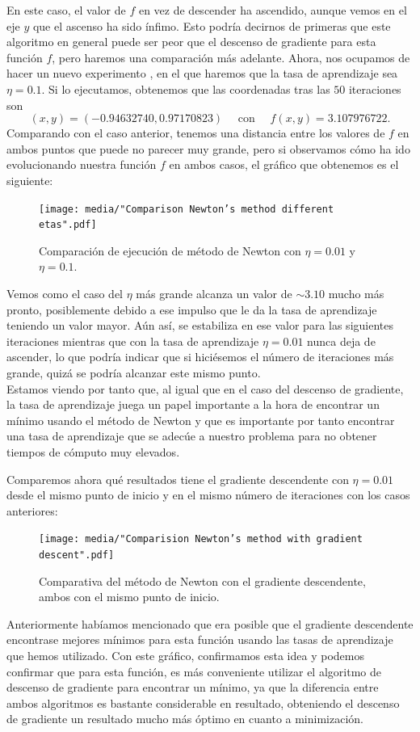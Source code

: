 \documentclass[12pt]{scrartcl}
\begin{document}
{En este caso, el valor de $f$ en vez de descender ha ascendido, aunque vemos en el eje $y$ que el ascenso ha sido ínfimo. Esto podría decirnos de primeras que este algoritmo en general puede ser peor que el descenso de gradiente para esta función $f$, pero haremos una comparación más adelante. 
Ahora, nos ocupamos de hacer un nuevo experimento , en el que haremos que la tasa de aprendizaje sea $\eta = 0.1$. Si lo ejecutamos, obtenemos que las coordenadas tras las $50$ iteraciones son 
$$
(x,y) = ( -0.94632740 ,  0.97170823 ) \quad \text{ con } \quad f(x,y) =3.107976722. 
$$
Comparando con el caso anterior, tenemos una distancia entre los valores de $f$ en ambos puntos que puede no parecer muy grande, pero si observamos cómo ha ido evolucionando nuestra función $f$ en ambos casos, el gráfico que obtenemos es el siguiente:
\begin{figure}[H]
  \centering
  \texttt{[image: media/"Comparison Newton's method different etas".pdf]}
  \caption{Comparación de ejecución de método de Newton con $\eta =0.01$ y $\eta = 0.1$.}
\end{figure}
Vemos como el caso del $\eta$ más grande alcanza un valor de $\sim 3.10$ mucho más pronto, posiblemente debido a ese impulso que le da la tasa de aprendizaje teniendo un valor mayor. Aún así, se estabiliza en ese valor para las siguientes iteraciones mientras que con la tasa de aprendizaje $\eta = 0.01$ nunca deja de ascender, lo que podría indicar que si hiciésemos
el número de iteraciones más grande, quizá se podría alcanzar este mismo punto.\\

Estamos viendo por tanto que, al igual que en el caso del descenso de gradiente, la tasa de aprendizaje juega un papel importante a la hora de encontrar un mínimo usando el método de Newton y que es importante por tanto encontrar una tasa de aprendizaje que se adecúe a nuestro problema para no obtener tiempos de cómputo muy elevados.

Comparemos ahora qué resultados tiene el gradiente descendente con $\eta =0.01$ desde el mismo punto de inicio y en el mismo número de iteraciones con los casos anteriores:
\begin{figure}[H]
  \centering
  \texttt{[image: media/"Comparision Newton's method with gradient descent".pdf]}
  \caption{Comparativa del método de Newton con el gradiente descendente, ambos con el mismo punto de inicio.}
\end{figure}

Anteriormente habíamos mencionado que era posible que el gradiente descendente encontrase mejores mínimos para esta función usando las tasas de aprendizaje que hemos utilizado. Con este gráfico, confirmamos esta idea y podemos confirmar que para 
esta función, es más conveniente utilizar el algoritmo de descenso de gradiente para encontrar un mínimo, ya que la diferencia entre ambos algoritmos es bastante considerable en resultado, obteniendo el descenso de gradiente un resultado mucho más óptimo
en cuanto a minimización.

}
\end{document}
